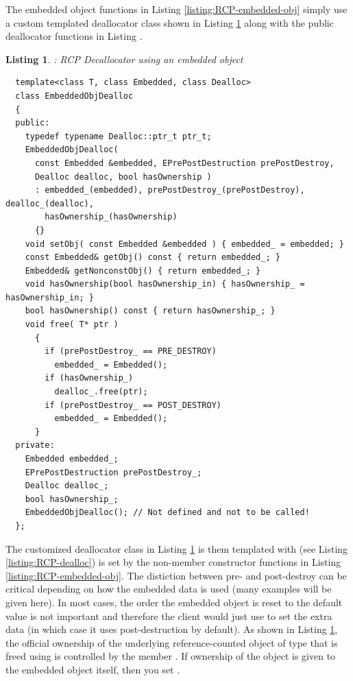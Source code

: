 \documentclass[pdf,ps2pdf,11pt]{SANDreport}
\newtheorem{listing}{Listing}
\begin{document}
The embedded object functions in Listing
{}\ref{listing:RCP-embedded-obj} simply use a custom templated
deallocator class shown in Listing
{}\ref{listing:RCP-EmbeddedObjDealloc} along with the public
deallocator functions in Listing {}.

\begin{listing}: RCP Decallocator using an embedded object \\
\label{listing:RCP-EmbeddedObjDealloc}
{\small\begin{verbatim}
  template<class T, class Embedded, class Dealloc>
  class EmbeddedObjDealloc
  {
  public:
    typedef typename Dealloc::ptr_t ptr_t;
    EmbeddedObjDealloc(
      const Embedded &embedded, EPrePostDestruction prePostDestroy,
      Dealloc dealloc, bool hasOwnership )
      : embedded_(embedded), prePostDestroy_(prePostDestroy), dealloc_(dealloc),
        hasOwnership_(hasOwnership)
      {}
    void setObj( const Embedded &embedded ) { embedded_ = embedded; }
    const Embedded& getObj() const { return embedded_; }
    Embedded& getNonconstObj() { return embedded_; }
    void hasOwnership(bool hasOwnership_in) { hasOwnership_ = hasOwnership_in; }
    bool hasOwnership() const { return hasOwnership_; }
    void free( T* ptr )
      {
        if (prePostDestroy_ == PRE_DESTROY)
          embedded_ = Embedded();
        if (hasOwnership_)
          dealloc_.free(ptr);
        if (prePostDestroy_ == POST_DESTROY)
          embedded_ = Embedded();
      }
  private:
    Embedded embedded_;
    EPrePostDestruction prePostDestroy_;
    Dealloc dealloc_;
    bool hasOwnership_;
    EmbeddedObjDealloc(); // Not defined and not to be called!
  };
\end{verbatim}}
\end{listing}

The customized deallocator class in Listing
{}\ref{listing:RCP-EmbeddedObjDealloc} is them templated with
{} (see Listing {}\ref{listing:RCP-dealloc}) is
set by the non-member constructor functions in Listing
{}\ref{listing:RCP-embedded-obj}.  The distiction between pre- and
post-destroy can be critical depending on how the embedded data is
used (many examples will be given here).  In most cases, the order the
embedded object is reset to the default value is not important and
therefore the client would just use {} 
to set the extra data (in which case it uses post-destruction by
default).  As shown in Listing {}\ref{listing:RCP-EmbeddedObjDealloc},
the official ownership of the underlying reference-counted object of
type {} that is freed using {} is
controlled by the {} member {}.
If ownership of the object is given to the embedded object itself,
then you set {}.
\end{document}
